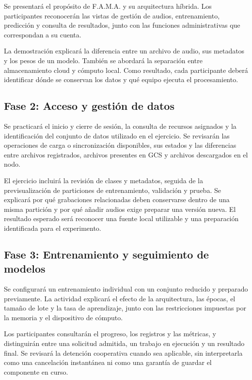 Se presentará el propósito de F.A.M.A. y su arquitectura híbrida. Los
participantes reconocerán las vistas de gestión de audios, entrenamiento,
predicción y consulta de resultados, junto con las funciones administrativas
que correspondan a su cuenta.

La demostración explicará la diferencia entre un archivo de audio, sus
metadatos y los pesos de un modelo. También se abordará la separación entre
almacenamiento cloud y cómputo local. Como resultado, cada participante deberá
identificar dónde se conservan los datos y qué equipo ejecuta el
procesamiento.

\subsection{Fase 2: Acceso y gestión de datos}

Se practicará el inicio y cierre de sesión, la consulta de recursos asignados y
la identificación del conjunto de datos utilizado en el ejercicio. Se
revisarán las operaciones de carga o sincronización disponibles, sus estados y
las diferencias entre archivos registrados, archivos presentes en GCS y
archivos descargados en el nodo.

El ejercicio incluirá la revisión de clases y metadatos, seguida de la
previsualización de particiones de entrenamiento, validación y prueba. Se
explicará por qué grabaciones relacionadas deben conservarse dentro de una
misma partición y por qué añadir audios exige preparar una versión nueva. El
resultado esperado será reconocer una fuente local utilizable y una
preparación identificada para el experimento.

\subsection{Fase 3: Entrenamiento y seguimiento de modelos}

Se configurará un entrenamiento individual con un conjunto reducido y
preparado previamente. La actividad explicará el efecto de la arquitectura,
las épocas, el tamaño de lote y la tasa de aprendizaje, junto con las
restricciones impuestas por la memoria y el dispositivo de cómputo.

Los participantes consultarán el progreso, los registros y las métricas, y
distinguirán entre una solicitud admitida, un trabajo en ejecución y un
resultado final. Se revisará la detención cooperativa cuando sea aplicable,
sin interpretarla como una cancelación instantánea ni como una garantía de
guardar el componente en curso.

